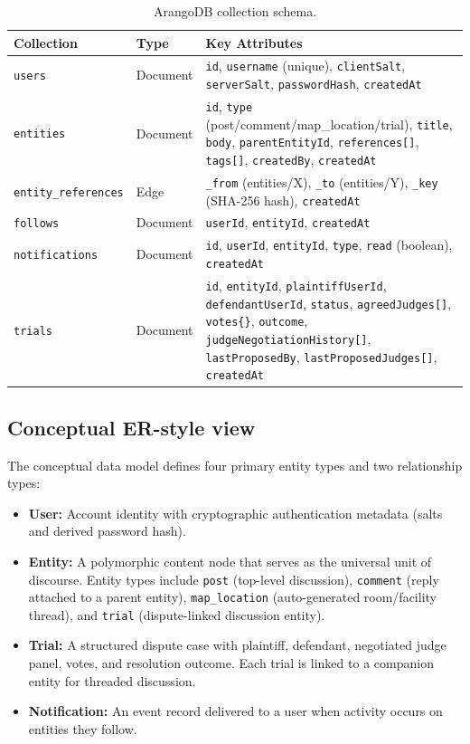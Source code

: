 \documentclass[13pt,a4paper]{report}
\begin{document}
\begin{table}[!htbp]
\centering
\caption{ArangoDB collection schema.}
\label{tab:collections}
\begin{tabularx}{\textwidth}{l l X}
\toprule
\textbf{Collection} & \textbf{Type} & \textbf{Key Attributes} \\
\midrule
\texttt{users} & Document & \texttt{id}, \texttt{username} (unique), \texttt{clientSalt}, \texttt{serverSalt}, \texttt{passwordHash}, \texttt{createdAt} \\
\texttt{entities} & Document & \texttt{id}, \texttt{type} (post/comment/map\_location/trial), \texttt{title}, \texttt{body}, \texttt{parentEntityId}, \texttt{references[]}, \texttt{tags[]}, \texttt{createdBy}, \texttt{createdAt} \\
\texttt{entity\_references} & Edge & \texttt{\_from} (entities/X), \texttt{\_to} (entities/Y), \texttt{\_key} (SHA-256 hash), \texttt{createdAt} \\
\texttt{follows} & Document & \texttt{userId}, \texttt{entityId}, \texttt{createdAt} \\
\texttt{notifications} & Document & \texttt{id}, \texttt{userId}, \texttt{entityId}, \texttt{type}, \texttt{read} (boolean), \texttt{createdAt} \\
\texttt{trials} & Document & \texttt{id}, \texttt{entityId}, \texttt{plaintiffUserId}, \texttt{defendantUserId}, \texttt{status}, \texttt{agreedJudges[]}, \texttt{votes\{\}}, \texttt{outcome}, \texttt{judgeNegotiationHistory[]}, \texttt{lastProposedBy}, \texttt{lastProposedJudges[]}, \texttt{createdAt} \\
\bottomrule
\end{tabularx}
\end{table}

\subsection{Conceptual ER-style view}
The conceptual data model defines four primary entity types and two relationship types:
\begin{itemize}
    \item \textbf{User:} Account identity with cryptographic authentication metadata (salts and derived password hash).
    \item \textbf{Entity:} A polymorphic content node that serves as the universal unit of discourse. Entity types include \texttt{post} (top-level discussion), \texttt{comment} (reply attached to a parent entity), \texttt{map\_location} (auto-generated room/facility thread), and \texttt{trial} (dispute-linked discussion entity).
    \item \textbf{Trial:} A structured dispute case with plaintiff, defendant, negotiated judge panel, votes, and resolution outcome. Each trial is linked to a companion entity for threaded discussion.
    \item \textbf{Notification:} An event record delivered to a user when activity occurs on entities they follow.
\end{itemize}
\end{document}
